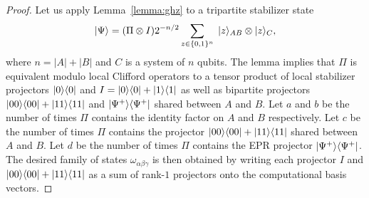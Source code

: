 \begin{proof}
Let us apply Lemma~\ref{lemma:ghz} to a tripartite stabilizer state
\[
|\Psi\rangle= (\Pi \otimes I)2^{-n/2}\sum_{z\in \{0,1\}^n }\; |z\rangle_{AB} \otimes |z\rangle_C ,
\]
where $n=|A|+|B|$ and $C$ is a system of $n$ qubits.
The lemma implies that 
$\Pi$ is equivalent modulo local Clifford operators to a tensor
product of local stabilizer projectors  $|0\rangle\langle 0|$ and $I=|0\rangle\langle 0|+|1\rangle\langle 1|$
as well as bipartite projectors
 $|00\rangle\langle 00|+|11\rangle\langle 11|$ 
and $|\Psi^+\rangle\langle \Psi^+|$ shared between $A$ and $B$.
Let $a$ and $b$ be the number of times $\Pi$ contains
the identity factor on $A$ and $B$ respectively. Let $c$ be the number of times
$\Pi$ contains the projector $|00\rangle\langle 00|+|11\rangle\langle 11|$ shared between $A$ and $B$.
Let $d$ be the number of times $\Pi$ contains the EPR projector $|\Psi^+\rangle\langle \Psi^+|$.
The desired family of states $\omega_{\alpha\beta\gamma}$ is then obtained
by writing each projector $I$ and $|00\rangle\langle 00|+|11\rangle\langle 11|$
as a sum of rank-$1$ projectors onto the computational basis vectors. 
\end{proof}
